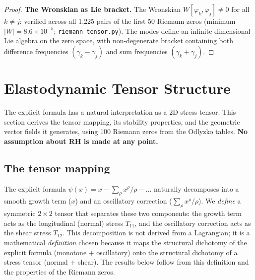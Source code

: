 \documentclass[11pt,a4paper]{article}
\theoremstyle{plain}
\theoremstyle{definition}
\theoremstyle{remark}
\begin{document}
\begin{proof}
\medskip
\noindent\textbf{The Wronskian as Lie bracket.}
The Wronskian $W[\varphi_k, \varphi_j] \neq 0$ for all $k \neq j$:
verified across all 1{,}225 pairs of the first 50 Riemann zeros
(minimum $|W| = 8.6 \times 10^{-5}$; \texttt{riemann\_tensor.py}).
The modes define an infinite-dimensional Lie algebra on the zero space,
with non-degenerate bracket containing both difference frequencies
$(\gamma_k - \gamma_j)$ and sum frequencies $(\gamma_k + \gamma_j)$.
\end{proof}

\section{Elastodynamic Tensor Structure}
\label{sec:tensor}

The explicit formula has a natural interpretation as a 2D stress tensor.
This section derives the tensor mapping, its stability properties, and
the geometric vector fields it generates, using 100 Riemann zeros from
the Odlyzko tables.  \textbf{No assumption about RH is made at any point.}

\subsection{The tensor mapping}

The explicit formula $\psi(x) = x - \sum_\rho x^\rho/\rho - \ldots$
naturally decomposes into a smooth growth term ($x$) and an oscillatory
correction ($\sum_\rho x^\rho/\rho$).  We \emph{define} a symmetric
$2 \times 2$ tensor that separates these two components:
the growth term acts as the longitudinal (normal) stress $T_{11}$, and the
oscillatory correction acts as the shear stress $T_{12}$.
This decomposition is not derived from a Lagrangian; it is a mathematical
\emph{definition} chosen because it maps the structural dichotomy of the
explicit formula (monotone $+$ oscillatory) onto the structural dichotomy
of a stress tensor (normal $+$ shear).  The results below follow from
this definition and the properties of the Riemann zeros.
\end{document}

